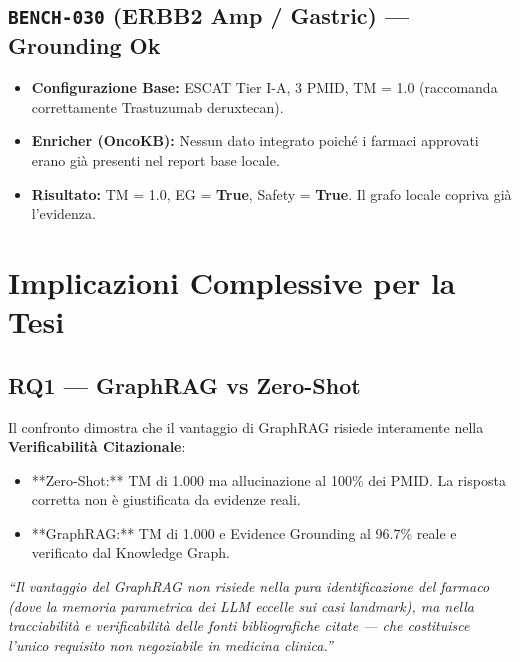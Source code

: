 \documentclass[12pt, a4paper]{article}
\newcommand{\pass}[1]{{\color{passgreen}\textbf{#1}}}
\newcommand{\bench}[1]{{\texttt{\textbf{#1}}}}
\begin{document}
\subsection{\bench{BENCH-030} (ERBB2 Amp / Gastric) --- Grounding Ok}
\begin{itemize}[leftmargin=1.6em, itemsep=2pt]
  \item \textbf{Configurazione Base:} ESCAT Tier I-A, 3 PMID, TM = 1.0 (raccomanda correttamente Trastuzumab deruxtecan).
  \item \textbf{Enricher (OncoKB):} Nessun dato integrato poiché i farmaci approvati erano già presenti nel report base locale.
  \item \textbf{Risultato:} TM = 1.0, EG = \pass{True}, Safety = \pass{True}. Il grafo locale copriva già l'evidenza.
\end{itemize}

\section{Implicazioni Complessive per la Tesi}

\subsection{RQ1 --- GraphRAG vs Zero-Shot}
Il confronto dimostra che il vantaggio di GraphRAG risiede interamente nella \textbf{Verificabilità Citazionale}:
\begin{itemize}[leftmargin=1.6em, itemsep=2pt]
  \item **Zero-Shot:** TM di 1.000 ma allucinazione al 100\% dei PMID. La risposta corretta non è giustificata da evidenze reali.
  \item **GraphRAG:** TM di 1.000 e Evidence Grounding al 96.7\% reale e verificato dal Knowledge Graph.
\end{itemize}
\textit{``Il vantaggio del GraphRAG non risiede nella pura identificazione del farmaco (dove la memoria parametrica dei LLM eccelle sui casi landmark), ma nella tracciabilità e verificabilità delle fonti bibliografiche citate --- che costituisce l'unico requisito non negoziabile in medicina clinica.''}
\end{document}
